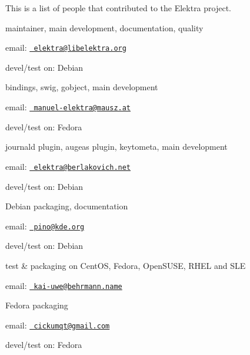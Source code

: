 This is a list of people that contributed to the Elektra project.

maintainer, main development, documentation, quality


\begin{DoxyItemize}
\item email\+: \href{mailto:elektra@libelektra.org}{\texttt{ elektra@libelektra.\+org}}
\item devel/test on\+: Debian
\end{DoxyItemize}

bindings, swig, gobject, main development


\begin{DoxyItemize}
\item email\+: \href{mailto:manuel-elektra@mausz.at}{\texttt{ manuel-\/elektra@mausz.\+at}}
\item devel/test on\+: Fedora
\end{DoxyItemize}

journald plugin, augeas plugin, keytometa, main development


\begin{DoxyItemize}
\item email\+: \href{mailto:elektra@berlakovich.net}{\texttt{ elektra@berlakovich.\+net}}
\item devel/test on\+: Debian
\end{DoxyItemize}

Debian packaging, documentation


\begin{DoxyItemize}
\item email\+: \href{mailto:pino@kde.org}{\texttt{ pino@kde.\+org}}
\item devel/test on\+: Debian
\end{DoxyItemize}

test \& packaging on Cent\+OS, Fedora, Open\+S\+U\+SE, R\+H\+EL and S\+LE


\begin{DoxyItemize}
\item email\+: \href{mailto:kai-uwe@behrmann.name}{\texttt{ kai-\/uwe@behrmann.\+name}}
\end{DoxyItemize}

Fedora packaging


\begin{DoxyItemize}
\item email\+: \href{mailto:cickumqt@gmail.com}{\texttt{ cickumqt@gmail.\+com}}
\item devel/test on\+: Fedora
\end{DoxyItemize}

